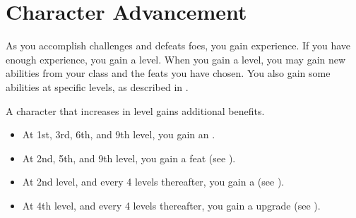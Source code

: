 \section{Character Advancement}\label{Character Advancement}

    As you accomplish challenges and defeats foes, you gain experience.
    If you have enough experience, you gain a level.
    When you gain a level, you may gain new abilities from your class and the feats you have chosen.
    You also gain some abilities at specific levels, as described in .

    A character that increases in level gains additional benefits.
    \begin{itemize}
        \item At 1st, 3rd, 6th, and 9th level, you gain an .
        \item At 2nd, 5th, and 9th level, you gain a feat (see ).
        \item At 2nd level, and every 4 levels thereafter, you gain a  (see ).
        \item At 4th level, and every 4 levels thereafter, you gain a  upgrade (see ).
    \end{itemize}

